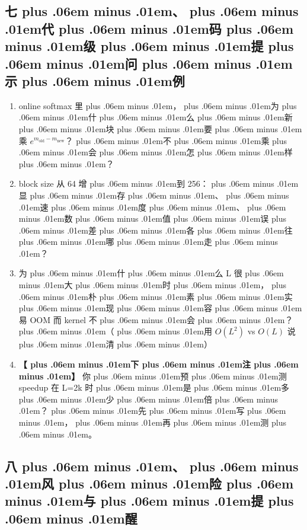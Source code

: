 \documentclass[
]{article}
\providecommand{\tightlist}{%
  \setlength{\itemsep}{0pt}\setlength{\parskip}{0pt}}
\def\zh#1{{\zhfont #1}}
\def\zhglue{\hskip0pt plus .06em minus .01em}
\begin{document}
\subsection{\zh{七\zhglue 、\zhglue 代\zhglue 码\zhglue 级\zhglue 提\zhglue 问\zhglue 示\zhglue 例}}\label{ux4e03ux4ee3ux7801ux7ea7ux63d0ux95eeux793aux4f8b-2}

\begin{enumerate}
\def\labelenumi{\arabic{enumi}.}
\tightlist
\item
  online softmax \zh{里\zhglue ，\zhglue 为\zhglue 什\zhglue 么\zhglue 新\zhglue 块\zhglue 要\zhglue 乘} \(e^{m_{\text{old}}-m_{\text{new}}}\)\zh{？\zhglue 不\zhglue 乘\zhglue 会\zhglue 怎\zhglue 样\zhglue ？}
\item
  block size \zh{从} 64 \zh{增\zhglue 到} 256\zh{：\zhglue 显\zhglue 存\zhglue 、\zhglue 速\zhglue 度\zhglue 、\zhglue 数\zhglue 值\zhglue 误\zhglue 差\zhglue 各\zhglue 往\zhglue 哪\zhglue 走\zhglue ？}
\item
  \zh{为\zhglue 什\zhglue 么} L \zh{很\zhglue 大\zhglue 时\zhglue ，\zhglue 朴\zhglue 素\zhglue 实\zhglue 现\zhglue 容\zhglue 易} OOM \zh{而} kernel \zh{不\zhglue 会\zhglue ？\zhglue （\zhglue 用} \(O(L^2)\) vs \(O(L)\) \zh{说\zhglue 清\zhglue ）}
\item
  \textbf{\zh{【\zhglue 下\zhglue 注\zhglue 】}} \zh{你\zhglue 预\zhglue 测} speedup \zh{在} L=2k \zh{时\zhglue 是\zhglue 多\zhglue 少\zhglue 倍\zhglue ？\zhglue 先\zhglue 写\zhglue ，\zhglue 再\zhglue 测\zhglue 。}
\end{enumerate}

\subsection{\zh{八\zhglue 、\zhglue 风\zhglue 险\zhglue 与\zhglue 提\zhglue 醒}}\label{ux516bux98ceux9669ux4e0eux63d0ux9192-3}
\end{document}
